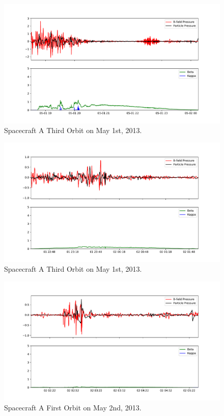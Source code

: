 \documentclass{report}
\begin{document}
\begin{figure}
\includegraphics[scale=.45]{A_Orbit3.pdf}
\caption{Spacecraft A Third Orbit on May 1st, 2013.}
\end{figure}

\begin{figure}
\includegraphics[scale=.45]{B_Orbit4_1.pdf}
\caption{Spacecraft A Third Orbit on May 1st, 2013.}
\end{figure}

\begin{figure}
\includegraphics[scale=.45]{B_Orbit4_2.pdf}
\caption{Spacecraft A First Orbit on May 2nd, 2013.}
\end{figure}
\end{document}
